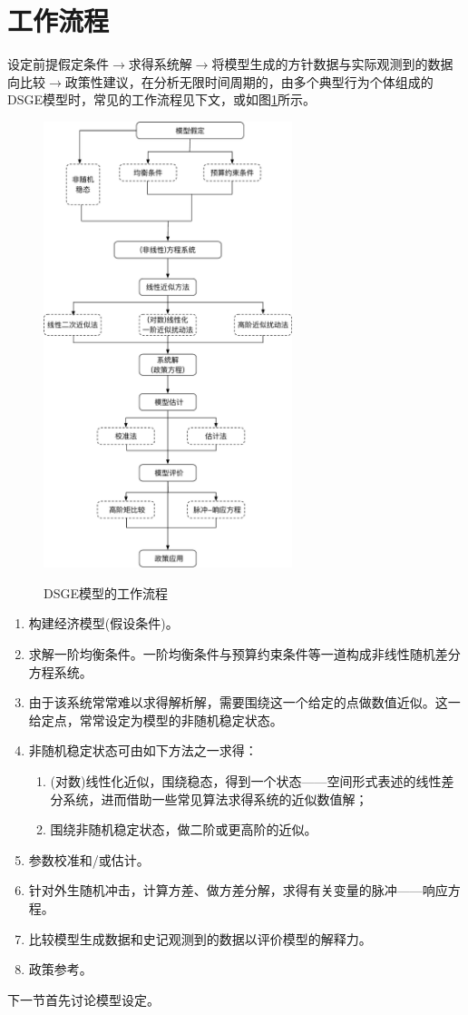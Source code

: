 \section{工作流程}
设定前提假定条件$\rightarrow$求得系统解$\rightarrow$将模型生成的方针数据与实际观测到的数据向比较$\rightarrow$政策性建议，在分析无限时间周期的，由多个典型行为个体组成的DSGE模型时，常见的工作流程见下文，或如图\ref{fig:DSGE-work-flow}所示。
\begin{figure}[htbp]
   \caption{DSGE模型的工作流程}
  \centering
  \includegraphics[height=13cm]{./Figures/20170701-DSGE-workflow}
  \label{fig:DSGE-work-flow}
%
\end{figure}

\begin{enumerate}
  \item 构建经济模型(假设条件)。
  \item 求解一阶均衡条件。一阶均衡条件与预算约束条件等一道构成非线性随机差分方程系统。
  \item 由于该系统常常难以求得解析解，需要围绕这一个给定的点做数值近似。这一给定点，常常设定为模型的非随机稳定状态。
  \item 非随机稳定状态可由如下方法之一求得：
  \begin{enumerate}
    \item (对数)线性化近似，围绕稳态，得到一个状态——空间形式表述的线性差分系统，进而借助一些常见算法求得系统的近似数值解；
    \item 围绕非随机稳定状态，做二阶或更高阶的近似。
  \end{enumerate}
  \item 参数校准和/或估计。
  \item 针对外生随机冲击，计算方差、做方差分解，求得有关变量的脉冲——响应方程。
  \item 比较模型生成数据和史记观测到的数据以评价模型的解释力。
  \item 政策参考。
\end{enumerate}
下一节首先讨论模型设定。


